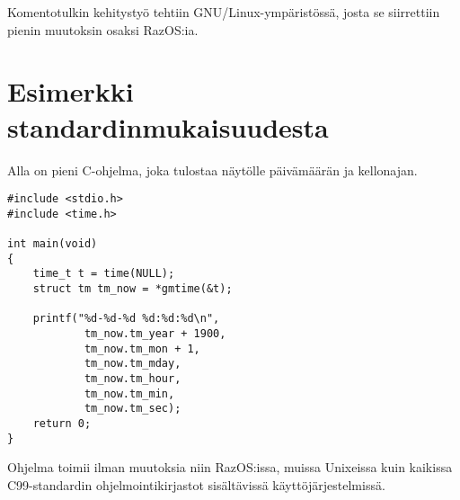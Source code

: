 Komentotulkin kehitystyö tehtiin GNU/Linux-ympäristössä, josta se siirrettiin pienin muutoksin osaksi RazOS:ia.

\section{Esimerkki standardinmukaisuudesta}

Alla on pieni C-ohjelma, joka tulostaa näytölle päivämäärän ja kellonajan.

\begin{footnotesize}
\begin{verbatim}
#include <stdio.h>
#include <time.h>

int main(void)
{
	time_t t = time(NULL);
	struct tm tm_now = *gmtime(&t);

	printf("%d-%d-%d %d:%d:%d\n",
			tm_now.tm_year + 1900,
			tm_now.tm_mon + 1,
			tm_now.tm_mday,
			tm_now.tm_hour,
			tm_now.tm_min,
			tm_now.tm_sec);
	return 0;
}
\end{verbatim}
\end{footnotesize}

Ohjelma toimii ilman muutoksia niin RazOS:issa, muissa Unixeissa kuin kaikissa C99-standardin ohjelmointikirjastot sisältävissä käyttöjärjestelmissä.
